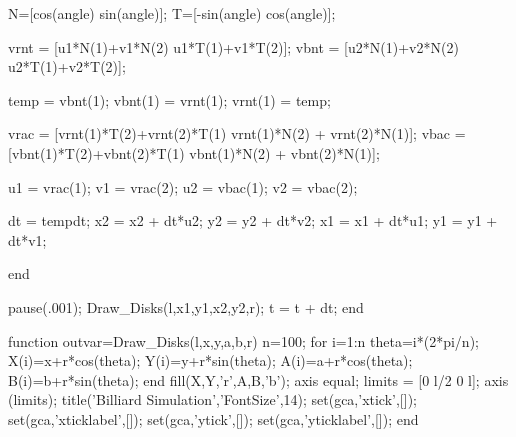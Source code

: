 \documentclass[12pt]{article}
\begin{document}
\begin{verbatimtab}
        N=[cos(angle) sin(angle)];
        T=[-sin(angle) cos(angle)];

        vrnt = [u1*N(1)+v1*N(2) u1*T(1)+v1*T(2)];
        vbnt = [u2*N(1)+v2*N(2) u2*T(1)+v2*T(2)];
       
        
        temp = vbnt(1);
        vbnt(1) = vrnt(1);
        vrnt(1) = temp;
        
        vrac = [vrnt(1)*T(2)+vrnt(2)*T(1) vrnt(1)*N(2) + vrnt(2)*N(1)];
        vbac = [vbnt(1)*T(2)+vbnt(2)*T(1) vbnt(1)*N(2) + vbnt(2)*N(1)];
        
        u1 = vrac(1);
        v1 = vrac(2);
        u2 = vbac(1);
        v2 = vbac(2);
        
        dt = tempdt;
        x2 = x2 + dt*u2;
        y2 = y2 + dt*v2;
        x1 = x1 + dt*u1;
        y1 = y1 + dt*v1;
        
    end
   
    pause(.001);
    Draw_Disks(l,x1,y1,x2,y2,r);
    t = t + dt;
end

function outvar=Draw_Disks(l,x,y,a,b,r)
n=100;
for i=1:n
    theta=i*(2*pi/n);
    X(i)=x+r*cos(theta);
    Y(i)=y+r*sin(theta);
    A(i)=a+r*cos(theta);
    B(i)=b+r*sin(theta);
end
fill(X,Y,'r',A,B,'b'); %
axis equal;
limits = [0 l/2 0 l];
axis (limits);
title('Billiard Simulation','FontSize',14);
set(gca,'xtick',[]); set(gca,'xticklabel',[]);
set(gca,'ytick',[]); set(gca,'yticklabel',[]);
end

\end{verbatimtab}
\end{document}
